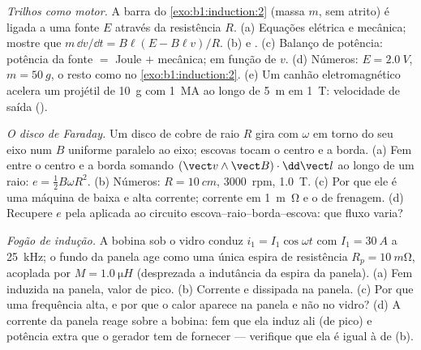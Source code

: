 \begin{exercise}[$\star\star\star$]\label{exo:b1:induction:10}
\emph{Trilhos como motor.} A barra do \cref{exo:b1:induction:2} (massa $m$,
sem atrito) é ligada a uma fonte $E$ através da resistência $R$.
(a) Equações elétrica e mecânica; mostre que $m\,\dd v/\dd t = B\ell(E -
B\ell v)/R$. (b)  e . (c) Balanço de potência:
potência da fonte $=$ Joule $+$ mecânica;  em função de
$v$. (d) Números: $E = \qty{2.0}{V}$, $m = \qty{50}{g}$, o resto como no
\cref{exo:b1:induction:2}. (e) Um canhão eletromagnético acelera um projétil de \qty{10}{g}
com \qty{1}{MA} ao longo de \qty{5}{m} em \qty{1}{T}: velocidade de saída
().
\end{exercise}

\begin{exercise}[$\star\star\star$]\label{exo:b1:induction:11}
\emph{O disco de Faraday.} Um disco de cobre de raio $R$ gira com  $\omega$
em torno do seu eixo num $B$ uniforme paralelo ao eixo; escovas tocam o centro
e a borda. (a) Fem entre o centro e a borda somando $(\vect v\wedge
\vect B)\cdot\dd\vect l$ ao longo de um raio: $e = \tfrac12B\omega R^2$. (b) Números:
$R = \qty{10}{cm}$, \qty{3000}{rpm}, \qty{1.0}{T}. (c) Por que ele é uma máquina
de baixa  e alta corrente; corrente em \qty{1}{m\ohm} e o
 de frenagem. (d) Recupere $e$ pela  aplicada ao
circuito escova--raio--borda--escova: que fluxo varia?
\end{exercise}

\begin{exercise}[$\star\star\star$]\label{exo:b1:induction:12}
\emph{Fogão de indução.} A bobina sob o vidro conduz $i_1 =
I_1\cos\omega t$ com $I_1 = \qty{30}{A}$ a \qty{25}{kHz}; o fundo da panela
age como uma única espira de resistência $R_p = \qty{10}{m\ohm}$, acoplada por
$M = \qty{1.0}{\micro H}$ (desprezada a indutância da espira da panela). (a) Fem
induzida na panela, valor de pico. (b) Corrente e  dissipada
na panela. (c) Por que uma frequência alta, e por que o calor aparece na
panela e não no vidro? (d) A corrente da panela reage sobre a bobina:
fem que ela induz ali (de pico) e potência extra que o gerador tem de
fornecer --- verifique que ela é igual à de (b).
\end{exercise}

